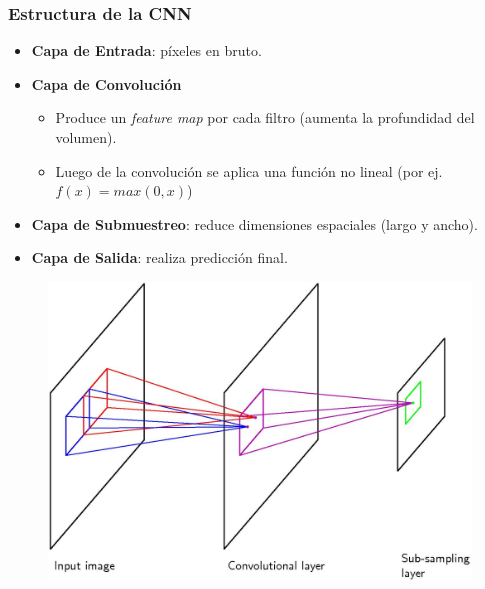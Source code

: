 \documentclass[10pt,center]{beamer}
\begin{document}
\begin{frame}
  \frametitle{Estructura de la CNN}
    \begin{itemize}
     \item \textbf{Capa de Entrada}: píxeles en bruto.
     \item \textbf{Capa de Convolución}
     \begin{itemize}
      \item Produce un \textit{feature map} por cada filtro (aumenta la profundidad del volumen).
      \item Luego de la convolución se aplica una función no lineal (por ej. $f(x) = max(0,x)$)
     \end{itemize}
     \item \textbf{Capa de Submuestreo}: reduce dimensiones espaciales (largo y ancho).
     \item \textbf{Capa de Salida}: realiza predicción final. 
    \end{itemize}
  \begin{figure}[h]
    \begin{center}
    \includegraphics[height=0.45\textheight]{./img/bishop_cnn.jpg}
    \end{center}
  \end{figure}
\end{frame}
\end{document}
